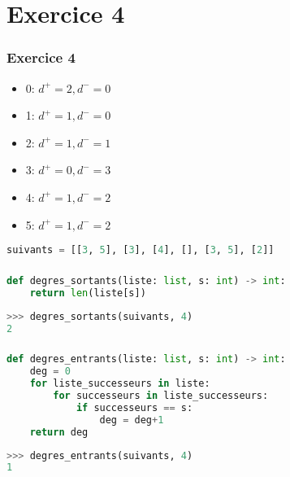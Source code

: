 \documentclass[svgnames,11pt]{beamer}
\begin{document}
\section{Exercice 4}
\begin{frame}[fragile]
    \frametitle{Exercice 4}


    \begin{itemize}
        \item 0: $d^+=2, d^-=0$
        \item 1: $d^+=1, d^-=0$
        \item 2: $d^+=1, d^-=1$
        \item 3: $d^+=0, d^-=3$
        \item 4: $d^+=1, d^-=2$
        \item 5: $d^+=1, d^-=2$
    \end{itemize}
    \begin{center}
\begin{lstlisting}[language=Python , basicstyle=\ttfamily\small, xleftmargin=1em, xrightmargin=0em]
suivants = [[3, 5], [3], [4], [], [3, 5], [2]]
\end{lstlisting}
\end{center}
\end{frame}
\begin{frame}[fragile]
    \frametitle{}

\begin{center}
\begin{lstlisting}[language=Python , basicstyle=\ttfamily\small, xleftmargin=1em, xrightmargin=0em]
def degres_sortants(liste: list, s: int) -> int:
    return len(liste[s])
\end{lstlisting}
\end{center}
\begin{center}
\begin{lstlisting}[language=Python , basicstyle=\ttfamily\small, xleftmargin=2em, xrightmargin=2em]
>>> degres_sortants(suivants, 4)
2
\end{lstlisting}
\label{CODE}
\end{center}
\end{frame}
\begin{frame}[fragile]
    \frametitle{}

\begin{center}
\begin{lstlisting}[language=Python , basicstyle=\ttfamily\small, xleftmargin=1em, xrightmargin=0em]
def degres_entrants(liste: list, s: int) -> int:
    deg = 0
    for liste_successeurs in liste:
        for successeurs in liste_successeurs:
            if successeurs == s:
                deg = deg+1
    return deg
\end{lstlisting}
\end{center}
\begin{center}
\begin{lstlisting}[language=Python , basicstyle=\ttfamily\small, xleftmargin=2em, xrightmargin=2em]
>>> degres_entrants(suivants, 4)
1
\end{lstlisting}
\label{CODE}
\end{center}
\end{frame}
\end{document}
